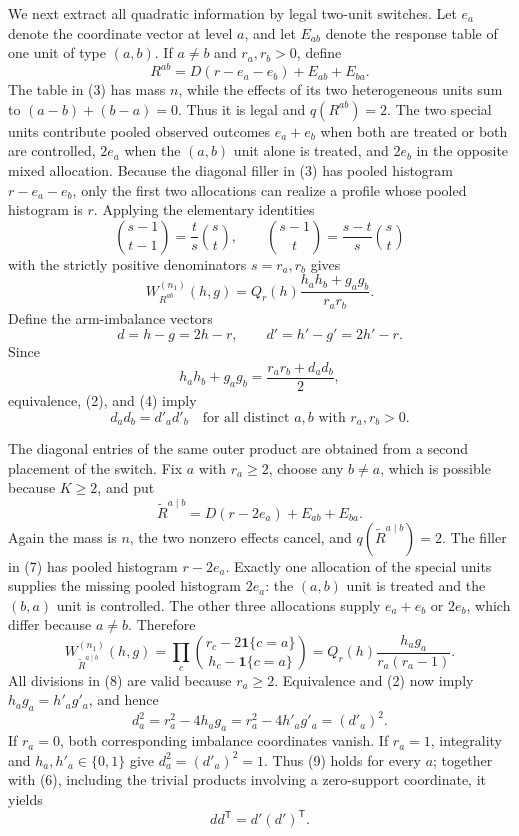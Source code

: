We next extract all quadratic information by legal two-unit switches. Let \(e_a\) denote the coordinate vector at level \(a\), and let \(E_{ab}\) denote the response table of one unit of type \((a,b)\). If \(a\neq b\) and \(r_a,r_b>0\), define
\[
 R^{ab}=D(r-e_a-e_b)+E_{ab}+E_{ba}.
 \tag{3}
\]
The table in (3) has mass \(n\), while the effects of its two heterogeneous units sum to \((a-b)+(b-a)=0\). Thus it is legal and \(q(R^{ab})=2\). The two special units contribute pooled observed outcomes \(e_a+e_b\) when both are treated or both are controlled, \(2e_a\) when the \((a,b)\) unit alone is treated, and \(2e_b\) in the opposite mixed allocation. Because the diagonal filler in (3) has pooled histogram \(r-e_a-e_b\), only the first two allocations can realize a profile whose pooled histogram is \(r\). Applying the elementary identities
\[
 \binom{s-1}{t-1}=\frac ts\binom st,
 \qquad
 \binom{s-1}{t}=\frac{s-t}{s}\binom st
\]
with the strictly positive denominators \(s=r_a,r_b\) gives
\[
 W_{R^{ab}}^{(n_1)}(h,g)
 =Q_r(h)\frac{h_ah_b+g_ag_b}{r_ar_b}.
 \tag{4}
\]
Define the arm-imbalance vectors
\[
 d=h-g=2h-r,\qquad d'=h'-g'=2h'-r.
\]
Since
\[
 h_ah_b+g_ag_b=\frac{r_ar_b+d_ad_b}{2},
 \tag{5}
\]
equivalence, (2), and (4) imply
\[
 d_ad_b=d'_ad'_b
 \quad\text{for all distinct }a,b\text{ with }r_a,r_b>0.
 \tag{6}
\]

The diagonal entries of the same outer product are obtained from a second placement of the switch. Fix \(a\) with \(r_a\geq2\), choose any \(b\neq a\), which is possible because \(K\geq2\), and put
\[
 \widetilde R^{a\mid b}=D(r-2e_a)+E_{ab}+E_{ba}.
 \tag{7}
\]
Again the mass is \(n\), the two nonzero effects cancel, and \(q(\widetilde R^{a\mid b})=2\). The filler in (7) has pooled histogram \(r-2e_a\). Exactly one allocation of the special units supplies the missing pooled histogram \(2e_a\): the \((a,b)\) unit is treated and the \((b,a)\) unit is controlled. The other three allocations supply \(e_a+e_b\) or \(2e_b\), which differ because \(a\neq b\). Therefore
\[
 W_{\widetilde R^{a\mid b}}^{(n_1)}(h,g)
 =\prod_c\binom{r_c-2\mathbf 1\{c=a\}}
                       {h_c-\mathbf 1\{c=a\}}
 =Q_r(h)\frac{h_ag_a}{r_a(r_a-1)}.
 \tag{8}
\]
All divisions in (8) are valid because \(r_a\geq2\). Equivalence and (2) now imply \(h_ag_a=h'_ag'_a\), and hence
\[
 d_a^2=r_a^2-4h_ag_a=r_a^2-4h'_ag'_a=(d'_a)^2.
 \tag{9}
\]
If \(r_a=0\), both corresponding imbalance coordinates vanish. If \(r_a=1\), integrality and \(h_a,h'_a\in\{0,1\}\) give \(d_a^2=(d'_a)^2=1\). Thus (9) holds for every \(a\); together with (6), including the trivial products involving a zero-support coordinate, it yields
\[
 dd^{\mathsf T}=d'(d')^{\mathsf T}.
 \tag{10}
\]

